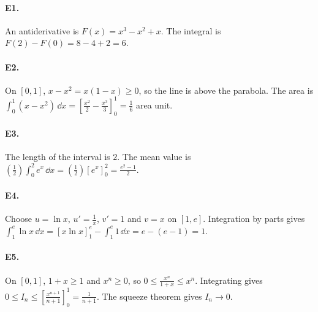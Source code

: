 \paragraph{E1.}An antiderivative is $F(x)=x^3-x^2+x$. The integral is $F(2)-F(0)=8-4+2=6$.

\paragraph{E2.}On $[0,1]$, $x-x^2=x(1-x)\ge0$, so the line is above the parabola. The area is $\int_0^1(x-x^2)\,\dd x=[\frac{x^2}{2}-\frac{x^3}{3}]_0^1=\frac{1}{6}$ area unit.

\paragraph{E3.}The length of the interval is $2$. The mean value is $(\frac{1}{2})\int_0^2e^x\,\dd x=(\frac{1}{2})[e^x]_0^2=\frac{e^2-1}{2}$.

\paragraph{E4.}Choose $u=\ln x$, $u'=\frac{1}{x}$, $v'=1$ and $v=x$ on $[1,e]$. Integration by parts gives $\int_1^e\ln x\,\dd x=[x\ln x]_1^e-\int_1^e1\,\dd x=e-(e-1)=1$.

\paragraph{E5.}On $[0,1]$, $1+x\ge1$ and $x^n\ge0$, so $0\le \frac{x^n}{1+x}\le x^n$. Integrating gives $0\le I_n\le[\frac{x^{n+1}}{n+1}]_0^1=\frac{1}{n+1}$. The squeeze theorem gives $I_n\to0$.

